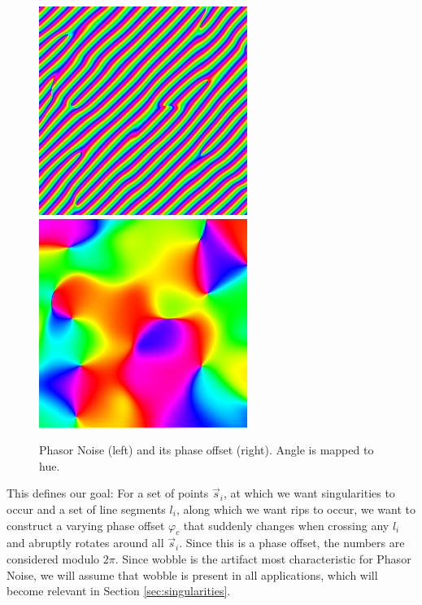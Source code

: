 \documentclass{utue} %
\begin{document}
\begin{figure}[ht]
  \centering
  \includegraphics[width=0.49\linewidth]{images/phasorNoise}
  \includegraphics[width=0.49\linewidth]{images/phasorPhase}
  \caption{Phasor Noise (left) and its phase offset (right). Angle is mapped to hue.}\label{fig:phasorNoisePhase}
\end{figure}

This defines our goal: For a set of points $\vec{s}_i$, at which we want singularities to occur and a set of line segments $l_i$, along which we want rips to occur, we want to construct a varying phase offset $\varphi_c$ that suddenly changes when crossing any $l_i$ and abruptly rotates around all $\vec{s}_i$. Since this is a phase offset, the numbers are considered modulo $2\pi$. Since wobble is the artifact most characteristic for Phasor Noise, we will assume that wobble is present in all applications, which will become relevant in Section \ref{sec:singularities}.
\end{document}
